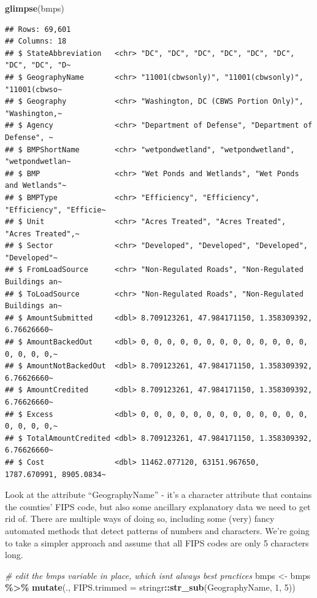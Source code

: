 \documentclass[]{article}
\newenvironment{Shaded}{\begin{snugshade}}{\end{snugshade}}
\newcommand{\AttributeTok}[1]{\textcolor[rgb]{0.13,0.29,0.53}{#1}}
\newcommand{\CommentTok}[1]{\textcolor[rgb]{0.56,0.35,0.01}{\textit{#1}}}
\newcommand{\DecValTok}[1]{\textcolor[rgb]{0.00,0.00,0.81}{#1}}
\newcommand{\FunctionTok}[1]{\textcolor[rgb]{0.13,0.29,0.53}{\textbf{#1}}}
\newcommand{\NormalTok}[1]{#1}
\newcommand{\OtherTok}[1]{\textcolor[rgb]{0.56,0.35,0.01}{#1}}
\newcommand{\SpecialCharTok}[1]{\textcolor[rgb]{0.81,0.36,0.00}{\textbf{#1}}}
\begin{document}
\begin{Shaded}
\begin{Highlighting}[]
\FunctionTok{glimpse}\NormalTok{(bmps)}
\end{Highlighting}
\end{Shaded}

\begin{verbatim}
## Rows: 69,601
## Columns: 18
## $ StateAbbreviation   <chr> "DC", "DC", "DC", "DC", "DC", "DC", "DC", "DC", "D~
## $ GeographyName       <chr> "11001(cbwsonly)", "11001(cbwsonly)", "11001(cbwso~
## $ Geography           <chr> "Washington, DC (CBWS Portion Only)", "Washington,~
## $ Agency              <chr> "Department of Defense", "Department of Defense", ~
## $ BMPShortName        <chr> "wetpondwetland", "wetpondwetland", "wetpondwetlan~
## $ BMP                 <chr> "Wet Ponds and Wetlands", "Wet Ponds and Wetlands"~
## $ BMPType             <chr> "Efficiency", "Efficiency", "Efficiency", "Efficie~
## $ Unit                <chr> "Acres Treated", "Acres Treated", "Acres Treated",~
## $ Sector              <chr> "Developed", "Developed", "Developed", "Developed"~
## $ FromLoadSource      <chr> "Non-Regulated Roads", "Non-Regulated Buildings an~
## $ ToLoadSource        <chr> "Non-Regulated Roads", "Non-Regulated Buildings an~
## $ AmountSubmitted     <dbl> 8.709123261, 47.984171150, 1.358309392, 6.76626660~
## $ AmountBackedOut     <dbl> 0, 0, 0, 0, 0, 0, 0, 0, 0, 0, 0, 0, 0, 0, 0, 0, 0,~
## $ AmountNotBackedOut  <dbl> 8.709123261, 47.984171150, 1.358309392, 6.76626660~
## $ AmountCredited      <dbl> 8.709123261, 47.984171150, 1.358309392, 6.76626660~
## $ Excess              <dbl> 0, 0, 0, 0, 0, 0, 0, 0, 0, 0, 0, 0, 0, 0, 0, 0, 0,~
## $ TotalAmountCredited <dbl> 8.709123261, 47.984171150, 1.358309392, 6.76626660~
## $ Cost                <dbl> 11462.077120, 63151.967650, 1787.670991, 8905.0834~
\end{verbatim}

Look at the attribute ``GeographyName'' - it's a character attribute
that contains the counties' FIPS code, but also some ancillary
explanatory data we need to get rid of. There are multiple ways of doing
so, including some (very) fancy automated methods that detect patterns
of numbers and characters. We're going to take a simpler approach and
assume that all FIPS codes are only 5 characters long.

\begin{Shaded}
\begin{Highlighting}[]
\CommentTok{\# edit the bmps variable in place, which isn\textquotesingle{}t always best practices}
\NormalTok{bmps }\OtherTok{\textless{}{-}}\NormalTok{ bmps }\SpecialCharTok{\%\textgreater{}\%} \FunctionTok{mutate}\NormalTok{(., }\AttributeTok{FIPS.trimmed =}\NormalTok{ stringr}\SpecialCharTok{::}\FunctionTok{str\_sub}\NormalTok{(GeographyName, }\DecValTok{1}\NormalTok{, }\DecValTok{5}\NormalTok{))}
\end{Highlighting}
\end{Shaded}
\end{document}
